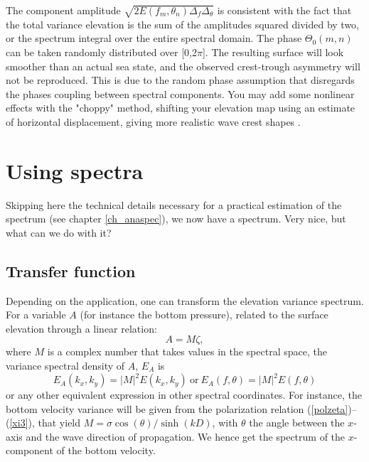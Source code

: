 The component amplitude $\sqrt{2E(f_m,\theta_n)\Delta_f \Delta_\theta}$  is consistent with the fact that the total variance 
elevation is the sum of the amplitudes squared divided by two, or the spectrum integral over the entire spectral domain. 
The phase $\Theta_0(m,n)$ can be taken randomly distributed over [0,2$\pi$]. The resulting surface will look smoother than 
an actual sea state, and the observed crest-trough asymmetry will not be reproduced. This is due to the random phase assumption 
that disregards the phases coupling between spectral components. You may add some nonlinear effects with the "choppy" method, shifting your elevation map using an estimate of horizontal displacement, giving more realistic wave crest shapes \citep{Nouguier&al.2009}.  %

\section{Using spectra}
Skipping here the technical details necessary for a practical estimation of the spectrum  (see chapter \ref{ch_anaspec}), we now have a spectrum. Very nice, but what 
can we do with it? 

\subsection{Transfer function}\label{sub:transfer}
Depending on the application, one can transform the elevation variance spectrum. For a variable $A$ (for instance the bottom pressure), related to the  
surface elevation through a linear relation:
\begin{equation}
A=M\zeta,
\label{eq3.12}
\end{equation}
where $M$ is a complex number that takes values in the spectral space, the variance spectral density of $A$, $E_A$ is 
\begin{equation}
E_{A}(k_{x},k_{y})=|M|^{2}E(k_{x},k_{y})~\mathrm{or}~ E_{A}(f,\theta)=|M|^{2}E(f,\theta)
\label{eq:transfert}
\end{equation}
or any other equivalent expression in other spectral coordinates. For instance, the bottom velocity variance will be given from the polarization relation (\ref{polzeta})--(\ref{xi3}), that yield 
$M=\sigma \cos(\theta)/\sinh(kD)$, with $\theta$ the angle between the $x$-axis and the wave direction of propagation. We hence 
get the spectrum of the $x$-component of the bottom velocity.

